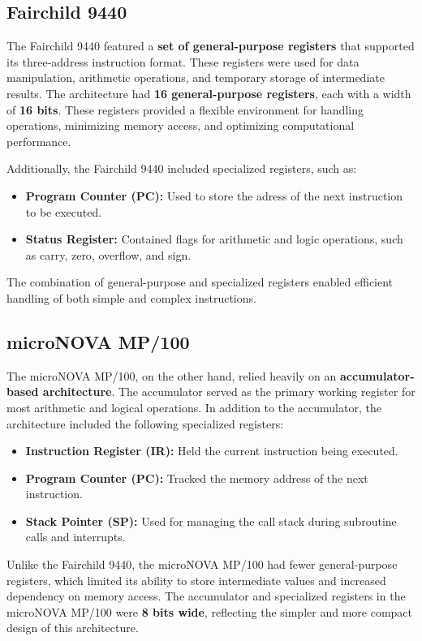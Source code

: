 \documentclass[a4paper,12pt]{article}
\begin{document}
\subsection{Fairchild 9440}

The Fairchild 9440 featured a \textbf{set of general-purpose registers} that supported its three-address instruction format. These registers were used for data manipulation, arithmetic operations, and temporary storage of intermediate results. The architecture had \textbf{16 general-purpose registers}, each with a width of \textbf{16 bits}. These registers provided a flexible environment for handling operations, minimizing memory access, and optimizing computational performance.

Additionally, the Fairchild 9440 included specialized registers, such as:
\begin{itemize}
    \item \textbf{Program Counter (PC):} Used to store the adress of the next instruction to be executed.
    \item \textbf{Status Register:} Contained flags for arithmetic and logic operations, such as carry, zero, overflow, and sign.
\end{itemize}

The combination of general-purpose and specialized registers enabled efficient handling of both simple and complex instructions.

\subsection{microNOVA MP/100}

The microNOVA MP/100, on the other hand, relied heavily on an \textbf{accumulator-based architecture}. The accumulator served as the primary working register for most arithmetic and logical operations. In addition to the accumulator, the architecture included the following specialized registers:
\begin{itemize}
    \item \textbf{Instruction Register (IR):} Held the current instruction being executed.
    \item \textbf{Program Counter (PC):} Tracked the memory address of the next instruction.
    \item \textbf{Stack Pointer (SP):} Used for managing the call stack during subroutine calls and interrupts.
\end{itemize}

Unlike the Fairchild 9440, the microNOVA MP/100 had fewer general-purpose registers, which limited its ability to store intermediate values and increased dependency on memory access. The accumulator and specialized registers in the microNOVA MP/100 were \textbf{8 bits wide}, reflecting the simpler and more compact design of this architecture.
\end{document}
